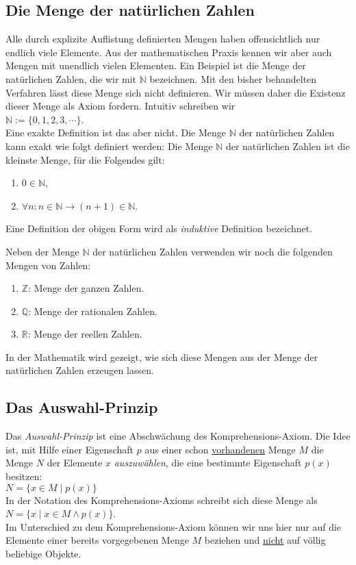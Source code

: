 \subsection{Die Menge der nat\"{u}rlichen Zahlen}
Alle durch explizite Auflistung definierten Mengen haben offensichtlich nur endlich viele
Elemente.  Aus der mathematischen Praxis kennen wir aber auch Mengen mit unendlich vielen
Elementen.  Ein Beispiel ist die Menge der nat\"{u}rlichen Zahlen, die wir mit $\mathbb{N}$
bezeichnen.  Mit den bisher behandelten Verfahren l\"{a}sst diese Menge sich nicht definieren.
Wir m\"{u}ssen daher die Existenz dieser Menge als Axiom fordern.  Intuitiv schreiben wir 
\\[0.2cm]
\hspace*{1.3cm} 
$\mathbb{N} := \{ 0, 1, 2, 3, \cdots \}$. 
\\[0.2cm]
Eine exakte Definition ist das aber nicht.  Die Menge $\mathbb{N}$ der
nat\"{u}rlichen Zahlen kann exakt wie folgt definiert werden:
Die Menge $\mathbb{N}$ der nat\"{u}rlichen Zahlen ist die kleinste Menge, f\"{u}r die Folgendes
gilt:
\begin{enumerate}
\item $0 \in \mathbb{N}$,
\item $\forall n: n \in \mathbb{N} \rightarrow (n + 1) \in \mathbb{N}$.
\end{enumerate}
Eine Definition der obigen Form wird als \emph{induktive} Definition bezeichnet.

Neben der Menge $\mathbb{N}$ der nat\"{u}rlichen Zahlen verwenden wir noch die folgenden
Mengen von Zahlen: 
\begin{enumerate}
\item $\mathbb{Z}$: Menge der ganzen Zahlen.
\item $\mathbb{Q}$: Menge der rationalen Zahlen.
\item $\mathbb{R}$: Menge der reellen Zahlen.
\end{enumerate}
In der Mathematik wird gezeigt, wie sich diese Mengen aus der Menge der nat\"{u}rlichen Zahlen
erzeugen lassen.

\subsection{Das Auswahl-Prinzip}
Das \emph{Auswahl-Prinzip} ist eine Abschw\"{a}chung des Komprehensions-Axiom.  Die Idee
ist, mit Hilfe einer Eigenschaft $p$ aus einer schon \underline{vorhandenen} Menge $M$ die
Menge $N$ der  
Elemente $x$ \emph{auszuw\"{a}hlen}, die eine bestimmte Eigenschaft $p(x)$ besitzen: \\[0.2cm]
\hspace*{1.3cm} $N = \{ x\in M \;|\; p(x) \}$ \\[0.2cm]
In der Notation des Komprehensions-Axioms schreibt sich diese Menge als \\[0.2cm]
\hspace*{1.3cm} $N = \{ x \mid x \in M \wedge p(x) \}$. \\[0.2cm]
Im Unterschied zu dem Komprehensions-Axiom k\"{o}nnen wir uns hier nur auf die Elemente einer
bereits vorgegebenen Menge $M$ beziehen und \underline{nicht} auf v\"{o}llig beliebige Objekte.

